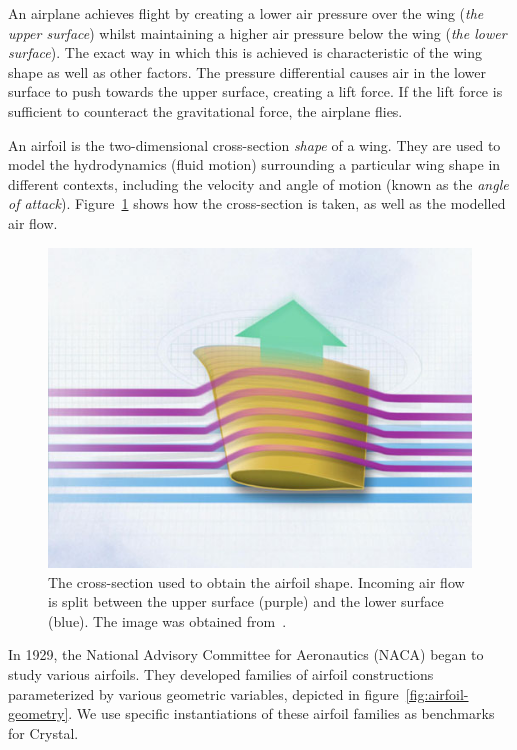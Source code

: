 An airplane achieves flight by creating a lower air pressure over the wing (\emph{the upper surface}) whilst maintaining a higher air pressure below the wing (\emph{the lower surface}). The exact way in which this is achieved is characteristic of the wing shape as well as other factors. The pressure differential causes air in the lower surface to push towards the upper surface, creating a lift force. If the lift force is sufficient to counteract the gravitational force, the airplane flies.

An airfoil is the two-dimensional cross-section \emph{shape} of a wing. They are used to model the hydrodynamics (fluid motion) surrounding a particular wing shape in different contexts, including the velocity and angle of motion (known as the \emph{angle of attack}). Figure~\ref{fig:airfoil-crosscut} shows how the cross-section is taken, as well as the modelled air flow.

\begin{figure}
\includegraphics[width=\imagewidth]{images/background/airfoil_crosscut.jpg}
    \caption{The cross-section used to obtain the airfoil shape. Incoming air flow is split between the upper surface (purple) and the lower surface (blue). The image was obtained from~\cite{boeing2014airfoil}.}
    \label{fig:airfoil-crosscut}
\end{figure}


In 1929, the National Advisory Committee for Aeronautics (NACA) began to study various airfoils. They developed families of airfoil constructions parameterized by various geometric variables, depicted in figure~\ref{fig:airfoil-geometry}. We use specific instantiations of these airfoil families as benchmarks for Crystal.

